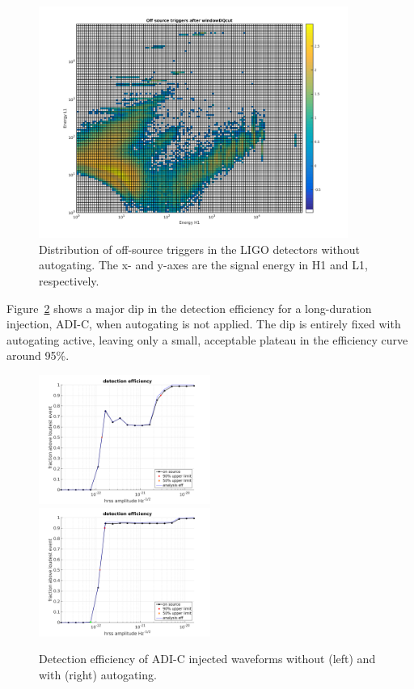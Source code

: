 \begin{figure}[htb]
	\includegraphics[trim={2cm 1.2cm 2cm 1.2cm}, clip, width=0.9\textwidth]{figures/grb/triggers-before.png}
	\caption{Distribution of off-source triggers in the LIGO detectors without autogating. The x- and y-axes are the signal energy in H1 and L1, respectively.}
	\label{fig:triggers-before}
\end{figure}

Figure~\ref{fig:eff-before-after} shows a major dip in the detection efficiency for a long-duration injection, ADI-C, when autogating is not applied.
The dip is entirely fixed with autogating active, leaving only a small, acceptable plateau in the efficiency curve around 95\%.

\begin{figure}[htb]
	\includegraphics[trim={1.1cm 0 1.6cm 0}, clip, width=0.5\textwidth]{figures/grb/eff-before.png}
		\includegraphics[trim={1.1cm 0 1.6cm 0}, clip, width=0.5\textwidth]{figures/grb/eff-after.png}
	\caption{Detection efficiency of ADI-C injected waveforms without (left) and with (right) autogating.}
	\label{fig:eff-before-after}
\end{figure}

